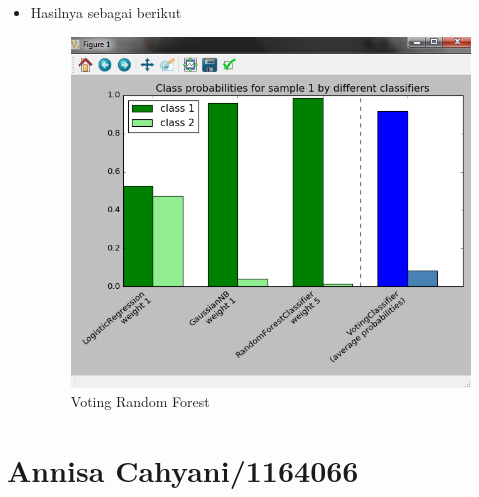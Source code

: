 \begin{itemize}
\begin{verbatim}
# plot annotations
plt.axvline(2.8, color='k', linestyle='dashed')
ax.set_xticks(ind + width)
ax.set_xticklabels(['LogisticRegression\nweight 1',
                    'GaussianNB\nweight 1',
                    'RandomForestClassifier\nweight 5',
                    'VotingClassifier\n(average probabilities)'],
                   rotation=40,
                   ha='right')
plt.ylim([0, 1])
plt.title('Class probabilities for sample 1 by different classifiers')
plt.legend([p1[0], p2[0]], ['class 1', 'class 2'], loc='upper left')
plt.tight_layout()
plt.show()
\end{verbatim}
\item
Hasilnya sebagai berikut 
\begin{figure}[ht]
\centering
\includegraphics[scale=0.5]{figures/teori6.png}
\caption{Voting Random Forest}
\label{Contoh}
\end{figure}
\end{itemize}

\section{Annisa Cahyani/1164066}
